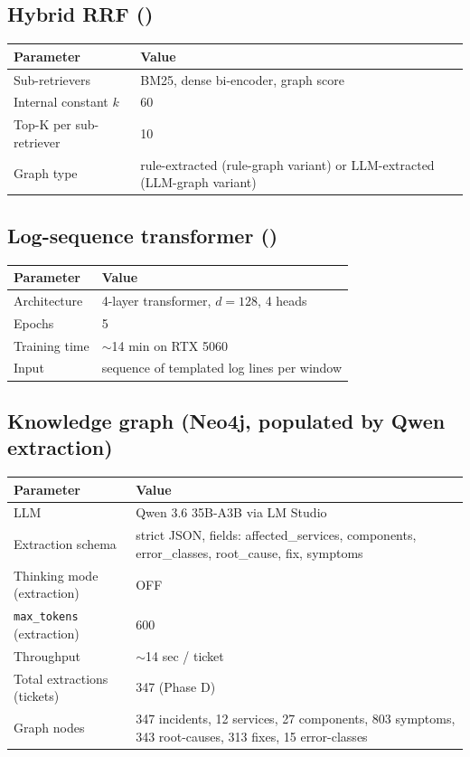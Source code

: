 \subsection{Hybrid RRF (\hrrf{})}

\begin{table}[h]
\centering
\small
\begin{tabular}{ll}
\toprule
Parameter & Value \\
\midrule
Sub-retrievers & BM25, dense bi-encoder, graph score \\
Internal \rrf{} constant $k$ & 60 \\
Top-K per sub-retriever & 10 \\
Graph type & rule-extracted (rule-graph variant) or LLM-extracted (LLM-graph variant) \\
\bottomrule
\end{tabular}
\end{table}

\subsection{Log-sequence transformer (\logseq{})}

\begin{table}[h]
\centering
\small
\begin{tabular}{ll}
\toprule
Parameter & Value \\
\midrule
Architecture & 4-layer transformer, $d=128$, 4 heads \\
Epochs & 5 \\
Training time & $\sim$14 min on RTX 5060 \\
Input & sequence of templated log lines per window \\
\bottomrule
\end{tabular}
\end{table}

\subsection{Knowledge graph (Neo4j, populated by Qwen extraction)}

\begin{table}[h]
\centering
\small
\begin{tabular}{ll}
\toprule
Parameter & Value \\
\midrule
LLM & Qwen 3.6 35B-A3B via LM Studio \\
Extraction schema & strict JSON, fields: affected\_services, components, error\_classes, root\_cause, fix, symptoms \\
Thinking mode (extraction) & OFF \\
\texttt{max\_tokens} (extraction) & 600 \\
Throughput & $\sim$14 sec / ticket \\
Total extractions (tickets) & 347 (Phase D) \\
Graph nodes & 347 incidents, 12 services, 27 components, 803 symptoms, 343 root-causes, 313 fixes, 15 error-classes \\
\bottomrule
\end{tabular}
\end{table}

